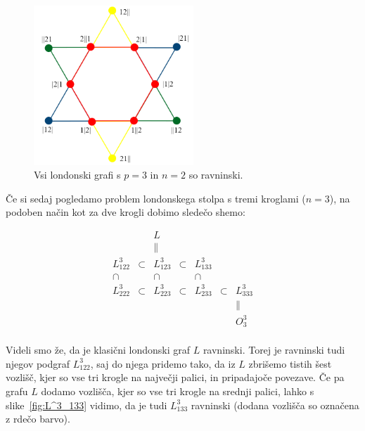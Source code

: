 \documentclass[twoside,11pt]{article}
\begin{document}
\begin{figure}[h]
    \centering
    \includegraphics[width=170pt]{img/tolgraph-2balls.png}
    \caption{Vsi londonski grafi s $p=3$ in $n=2$ so ravninski.}
    \label{fig:graf-2krogli}
\end{figure}

Če si sedaj pogledamo problem londonskega stolpa s tremi kroglami ($n=3$), na podoben način kot za dve krogli dobimo sledečo shemo:

\begin{equation}
\label{eq:grafi-3krogle}
\begin{matrix}
& & L & & & & \\
& & \parallel & & & & \\
L_{122}^3 & \subset & L_{123}^3 & \subset & L_{133}^3 & & \\
\cap & & \cap & & \cap & & \\
L_{222}^3 & \subset & L_{223}^3 & \subset & L_{233}^3 & \subset & L_{333}^3 \\
& & & & & & \parallel \\
& & & & & & O^3_3 \\
\end{matrix}
\end{equation}

Videli smo že, da je klasični londonski graf $L$ ravninski. Torej je ravninski tudi njegov podgraf $L_{122}^3$, saj do njega pridemo tako, da iz $L$ zbrišemo tistih šest vozlišč, kjer so vse tri krogle na največji palici, in pripadajoče povezave. 
Če pa grafu $L$ dodamo vozlišča, kjer so vse tri krogle na srednji palici, lahko s slike~\ref{fig:L^3_133} vidimo, da je tudi $L_{133}^3$ ravninski (dodana vozlišča so označena z rdečo barvo).
\end{document}
